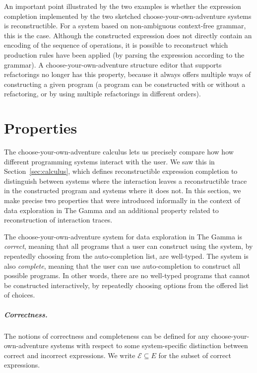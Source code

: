 \documentclass[anonymous, a4paper,UKenglish,cleveref, autoref, thm-restate]{lipics-v2021}
\begin{document}
An important point illustrated by the two examples is whether the expression completion
implemented by the two sketched choose-your-own-adventure systems is reconstructible.
For a system based on non-ambiguous context-free grammar, this is the case.
Although the constructed expression does not directly contain an encoding of the
sequence of operations, it is possible to reconstruct which production rules have been applied
(by parsing the expression according to the grammar). A choose-your-own-adventure structure
editor that supports refactorings no longer has this property, because it always offers multiple
ways of constructing a given program (a program can be constructed with or without a refactoring,
or by using multiple refactorings in different orders).

\newpage

\section{Properties}
\label{sec:properties}

The choose-your-own-adventure calculus lets us precisely compare how how different
programming systems interact with the user. We saw this in Section~\ref{sec:calculus}, which
defines reconstructible expression completion to distinguish between systems where the
interaction leaves a reconstructible trace in the constructed program and systems where it does not.
In this section, we make precise two properties that were introduced informally in the context of
data exploration in The Gamma \cite{petricek-2022-thegamma} and an additional property related
to reconstruction of interaction traces.

The choose-your-own-adventure system for data exploration in The Gamma is \emph{correct}, meaning that
all programs that a user can construct using the system, by repeatedly choosing from the
auto-completion list, are well-typed. The system is also \emph{complete}, meaning that the user can
use auto-completion to construct all possible programs. In other words, there are no well-typed programs
that cannot be constructed interactively, by repeatedly choosing options from the offered list of
choices.

\subparagraph{Correctness.}
The notions of correctness and completeness can be defined for any
choose-your-own-adventure systems with respect to some system-specific distinction between
correct and incorrect expressions. We write $\mathcal{E} \subseteq E$ for the subset
of correct expressions.
\end{document}
